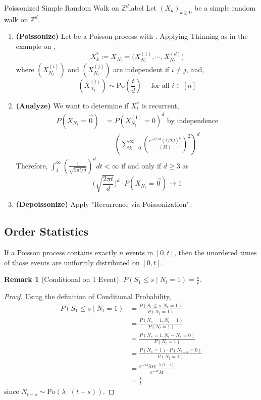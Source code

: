 \documentclass{tufte-handout}
\newtheorem{rmk}[thm]{Remark}
\begin{document}
\begin{ex}{Poissonized Simple Random Walk on $\mathbb{Z}^d$}{label}
  Let $(X_k)_{k \geq 0}$ be a simple random walk on $\mathbb{Z}^d$.
  \begin{enumerate}
    \item \textbf{(Poissonize)} Let  be a Poisson process with . Applying Thinning as in the example on ,
      \[X^*_k := X_{N_t} = \bigg( X_{N_t}^{(1)}, \cdots, X_{N_t}^{(d)} \bigg)\]
    \noindent where $(X_{N_t}^{(i)})$ and $(X_{N_t}^{(j)})$ are independent if $i \neq j$, and,
    \[(X_{N_t}^{(i)}) \sim \text{Po}\left(\frac{t}{d}\right) \quad \text{ for all $i \in [n]$}\]
    \item \textbf{(Analyze)} We want to determine if $X^*_t$ is recurrent,
      \begin{align*}
    P\left(X_{N_{t}}=\Vec{0}\right)&=P\left(X_{N_{t}}^{(1)}=0\right)^{d} \text{ by independence}\\
    &= \left(\sum_{k=0}^{\infty}\left(\frac{e^{-t / 2 d}(t / 2 d)^{k}}{(k !)}\right)^{2}\right)^d
  \end{align*}
  \noindent Therefore, $\int_{1}^{\infty}\left(\frac{1}{\sqrt{2 \pi t / d}}\right)^{d} d t<\infty \text { if and only if } d \geq 3$ as
  \[
  \bigg(\sqrt{\frac{2 \pi t}{d}}\bigg)^{d} \cdot P\left(X_{N_{t}}=\Vec{0}\right) \rightarrow 1
  \]
  \item \textbf{(Depoissonize)} Apply "Recurrence via Poissonization".
  \end{enumerate}
\end{ex}

\subsection{Order Statistics}
If a Poisson process contains exactly $n$ events in $[0, t]$, then the unordered times of those events are uniformly distributed on $[0, t]$.

\begin{rmk}[Conditional on 1 Event]
  $P\left(S_{1} \leq s \mid N_{t}=1\right) = \frac{s}{t}$.
\end{rmk}

\begin{proof}
  Using the definition of Conditional Probability,
  \begin{align*}
  P\left(S_{1} \leq s \mid N_{t}=1\right) &=\frac{P\left(S_{1} \leq s, N_{t}=1\right)}{P\left(N_{t}=1\right)} \\
  &=\frac{P\left(N_{s}=1, N_{t}=1\right)}{P\left(N_{t}=1\right)} \\
  &=\frac{P\left(N_{s}=1, N_{t}-N_{s}=0\right)}{P\left(N_{t}=1\right)} \\
  &=\frac{P\left(N_{s}=1\right) \cdot P\left(N_{t-s}=0\right)}{P\left(N_{t}=1\right)}\\
  &=\frac{e^{-\lambda s} \lambda s e^{-\lambda(t-s)}}{e^{-\lambda t} \lambda t}\\
  &=\frac{s}{t}
  \end{align*}
  \noindent since $N_{t-s} \sim \text{Po}(\lambda \cdot (t-s))$.
\end{proof}
\end{document}
